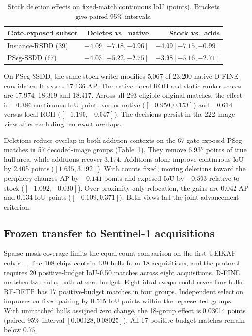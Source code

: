 \documentclass[journal]{IEEEtran}
\begin{document}
\begin{table}[t]
\centering
\caption{Stock deletion effects on fixed-match continuous IoU (points). Brackets give paired 95\% intervals.}
\label{tab:stock-deletions}
\footnotesize
\setlength{\tabcolsep}{3pt}
\begin{tabular}{@{}lrr@{}}
\toprule
Gate-exposed subset & Deletes vs.\ native & Stock vs.\ adds \\
\midrule
Instance-RSDD (39) & \(-4.09[-7.18,-0.96]\) & \(-4.09[-7.15,-0.99]\) \\
PSeg-SSDD (67) & \(-4.03[-5.22,-2.75]\) & \(-3.98[-5.16,-2.71]\) \\
\bottomrule
\end{tabular}
\end{table}

On PSeg-SSDD, the same stock writer modifies 5,067 of 23,200 native D-FINE candidates. It scores 17.136 AP. The native, local ROH and static ranker scores are 17.974, 18.319 and 18.417. Across all 293 eligible original matches, the effect is \(-0.386\) continuous IoU points versus native (\([-0.950,0.153]\)) and \(-0.614\) versus local ROH (\([-1.190,-0.047]\)). The decisions persist in the 222-image view after excluding ten exact overlaps.

Deletions reduce overlap in both addition contexts on the 67 gate-exposed PSeg matches in 57 decoded-image groups (Table~\ref{tab:stock-deletions}). They remove 6.937 points of true hull area, while additions recover 3.174. Additions alone improve continuous IoU by 2.405 points (\([1.635,3.192]\)). With counts fixed, moving deletions toward the periphery changes AP by \(-0.141\) points and exposed IoU by \(-0.503\) relative to stock (\([-1.092,-0.030]\)). Over proximity-only relocation, the gains are 0.042 AP and 0.134 IoU points (\([-0.109,0.371]\)). Both views fail the joint advancement criterion.

\subsection{Frozen transfer to Sentinel-1 acquisitions}
Sparse mask coverage limits the equal-count comparison on the first UEIKAP cohort~\cite{ueikap}. The 108 chips contain 139 hulls from 18 acquisitions, and the protocol requires 20 positive-budget IoU-0.50 matches across eight acquisitions. D-FINE matches two hulls, both at zero budget. Eight ideal swaps could cover four hulls. RF-DETR has 17 positive-budget matches in four groups. Independent selection improves on fixed pairing by 0.515 IoU points within the represented groups. With unmatched hulls assigned zero change, the 18-group effect is 0.03014 points (paired 95\% interval \([0.00028,0.08025]\)). All 17 positive-budget matches remain below 0.75.
\end{document}
